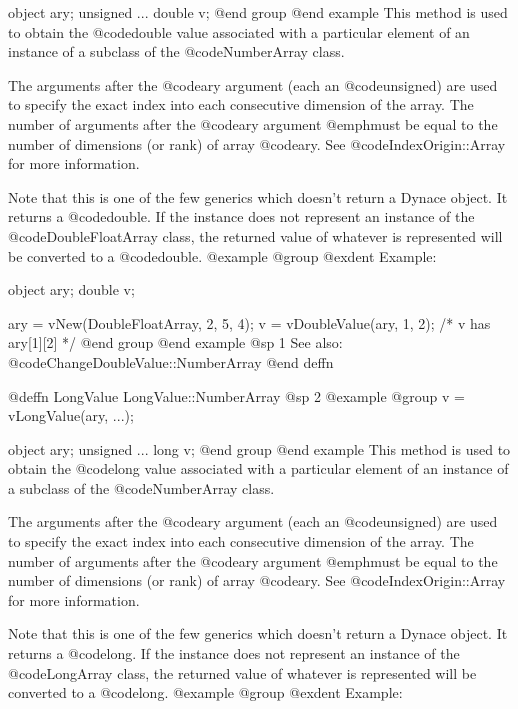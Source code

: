 object    ary;
unsigned  ...
double    v;
@end group
@end example
This method is used to obtain the @code{double} value associated with a
particular element of an instance of a subclass of the
@code{NumberArray} class.

The arguments after the @code{ary} argument (each an @code{unsigned})
are used to specify the exact index into each consecutive dimension of
the array.  The number of arguments after the @code{ary} argument
@emph{must} be equal to the number of dimensions (or rank) of array
@code{ary}.  See @code{IndexOrigin::Array} for more information.

Note that this is one of the few generics which doesn't return a Dynace
object.  It returns a @code{double}.  If the instance does not represent
an instance of the @code{DoubleFloatArray} class, the returned value of
whatever is represented will be converted to a @code{double}.
@example
@group
@exdent Example:

object  ary;
double  v;

ary = vNew(DoubleFloatArray, 2, 5, 4);
v = vDoubleValue(ary, 1, 2);
/*  v has ary[1][2]  */
@end group
@end example
@sp 1
See also:  @code{ChangeDoubleValue::NumberArray}
@end deffn











@deffn {LongValue} LongValue::NumberArray
@sp 2
@example
@group
v = vLongValue(ary, ...);

object    ary;
unsigned  ...
long      v;
@end group
@end example
This method is used to obtain the @code{long} value associated with a
particular element of an instance of a subclass of the
@code{NumberArray} class.

The arguments after the @code{ary} argument (each an @code{unsigned})
are used to specify the exact index into each consecutive dimension of
the array.  The number of arguments after the @code{ary} argument
@emph{must} be equal to the number of dimensions (or rank) of array
@code{ary}.  See @code{IndexOrigin::Array} for more information.

Note that this is one of the few generics which doesn't return a Dynace
object.  It returns a @code{long}.  If the instance does not represent
an instance of the @code{LongArray} class, the returned value of
whatever is represented will be converted to a @code{long}.
@example
@group
@exdent Example:

